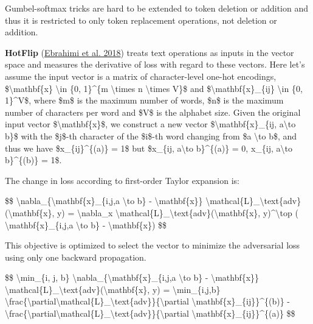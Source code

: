 Gumbel-softmax tricks are hard to be extended to token deletion or addition and thus it is restricted to only token replacement operations, not deletion or addition.

\label{hotflip}{}\textbf{HotFlip} (\href{https://arxiv.org/abs/1712.06751}{Ebrahimi et al. 2018}) treats text operations as inputs in the vector space and measures the derivative of loss with regard to these vectors. Here let's assume the input vector is a matrix of character-level one-hot encodings, \$\textbackslash mathbf\{x\} \textbackslash in \{0, 1\}\^{}\{m \textbackslash times n \textbackslash times V\}\$ and \$\textbackslash mathbf\{x\}\_\{ij\} \textbackslash in \{0, 1\}\^{}V\$, where \$m\$ is the maximum number of words, \$n\$ is the maximum number of characters per word and \$V\$ is the alphabet size. Given the original input vector \$\textbackslash mathbf\{x\}\$, we construct a new vector \$\textbackslash mathbf\{x\}\_\{ij, a\textbackslash to b\}\$ with the \$j\$-th character of the \$i\$-th word changing from \$a \textbackslash to b\$, and thus we have \$x\_\{ij\}\^{}\{(a)\} = 1\$ but \$x\_\{ij, a\textbackslash to b\}\^{}\{(a)\} = 0, x\_\{ij, a\textbackslash to b\}\^{}\{(b)\} = 1\$.

The change in loss according to first-order Taylor expansion is:

\$\$ \textbackslash nabla\_\{\textbackslash mathbf\{x\}\_\{i,j,a \textbackslash to b\} - \textbackslash mathbf\{x\}\} \textbackslash mathcal\{L\}\_\textbackslash text\{adv\}(\textbackslash mathbf\{x\}, y) = \textbackslash nabla\_x \textbackslash mathcal\{L\}\_\textbackslash text\{adv\}(\textbackslash mathbf\{x\}, y)\^{}\textbackslash top ( \textbackslash mathbf\{x\}\_\{i,j,a \textbackslash to b\} - \textbackslash mathbf\{x\}) \$\$

This objective is optimized to select the vector to minimize the adversarial loss using only one backward propagation.

\$\$ \textbackslash min\_\{i, j, b\} \textbackslash nabla\_\{\textbackslash mathbf\{x\}\_\{i,j,a \textbackslash to b\} - \textbackslash mathbf\{x\}\} \textbackslash mathcal\{L\}\_\textbackslash text\{adv\}(\textbackslash mathbf\{x\}, y) = \textbackslash min\_\{i,j,b\} \textbackslash frac\{\textbackslash partial\textbackslash mathcal\{L\}\_\textbackslash text\{adv\}\}\{\textbackslash partial \textbackslash mathbf\{x\}\_\{ij\}\}\^{}\{(b)\} - \textbackslash frac\{\textbackslash partial\textbackslash mathcal\{L\}\_\textbackslash text\{adv\}\}\{\textbackslash partial \textbackslash mathbf\{x\}\_\{ij\}\}\^{}\{(a)\} \$\$

